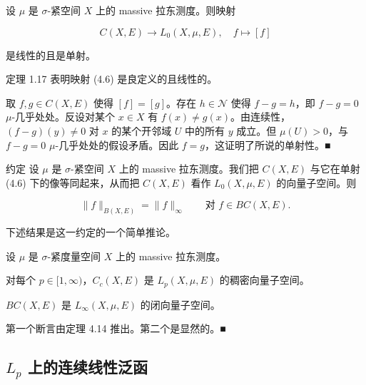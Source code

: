 \begin{proposition}

设 $ \mu $ 是 $ \sigma $-紧空间 $ X $ 上的 massive 拉东测度。则映射

\begin{equation}
C(X, E) \to L_0(X, \mu, E) , \quad f \mapsto [f]\tag{4.6}
\end{equation}

是线性的且是单射。

\proofhead
定理 1.17 表明映射 (4.6) 是良定义的且线性的。

取 $ f, g \in C(X, E) $ 使得 $ [f] = [g] $。存在 $ h \in \mathcal{N} $ 使得 $ f - g = h $，即 $ f - g = 0 $ $ \mu $-几乎处处。反设对某个 $ x \in X $ 有 $ f(x) \ne g(x) $。由连续性，$ (f - g)(y) \ne 0 $ 对 $ x $ 的某个开邻域 $ U $ 中的所有 $ y $ 成立。但 $ \mu(U) > 0 $，与 $ f - g = 0 $ $ \mu $-几乎处处的假设矛盾。因此 $ f = g $，这证明了所说的单射性。\nobreak\hspace{0.35em}■
\end{proposition}

约定 设 $ \mu $ 是 $ \sigma $-紧空间 $ X $ 上的 massive 拉东测度。我们把 $ C(X, E) $ 与它在单射 (4.6) 下的像等同起来，从而把 $ C(X, E) $ 看作 $ L_0(X, \mu, E) $ 的向量子空间。则

\[
\|f\|_{B(X,E)} = \|f\|_\infty \qquad \text{对 } f \in BC(X, E) .
\]

下述结果是这一约定的一个简单推论。

\begin{theorem}

设 $ \mu $ 是 $ \sigma $-紧度量空间 $ X $ 上的 massive 拉东测度。

\begin{subitems}
\item

对每个 $ p \in [1, \infty) $，$ C_c(X, E) $ 是 $ L_p(X, \mu, E) $ 的稠密向量子空间。

\item

$ BC(X, E) $ 是 $ L_\infty(X, \mu, E) $ 的闭向量子空间。

\proofhead
第一个断言由定理 4.14 推出。第二个是显然的。\nobreak\hspace{0.35em}■
\end{subitems}

\end{theorem}

\subsection*{$ L_p $ 上的连续线性泛函}

